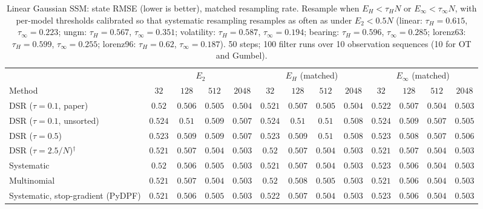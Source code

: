 \begin{table}[ht]
\centering
\small
\caption{Linear Gaussian SSM: state RMSE (lower is better), matched resampling rate. Resample when $E_H<\tau_HN$ or $E_\infty<\tau_\infty N$, with per-model thresholds calibrated so that systematic resampling resamples as often as under $E_2<0.5N$ (linear: $\tau_H{=}0.615$, $\tau_\infty{=}0.223$; ungm: $\tau_H{=}0.567$, $\tau_\infty{=}0.351$; volatility: $\tau_H{=}0.587$, $\tau_\infty{=}0.194$; bearing: $\tau_H{=}0.596$, $\tau_\infty{=}0.285$; lorenz63: $\tau_H{=}0.599$, $\tau_\infty{=}0.255$; lorenz96: $\tau_H{=}0.62$, $\tau_\infty{=}0.187$). 50 steps; 100 filter runs over 10 observation sequences (10 for OT and Gumbel).}
\label{tab:trigger-matched-linear-rmse}
\begin{adjustbox}{max width=\linewidth}
\begin{tabular}{lcccc|cccc|cccc}
\toprule
 & \multicolumn{4}{c}{$E_2$} & \multicolumn{4}{c}{$E_H$ (matched)} & \multicolumn{4}{c}{$E_\infty$ (matched)} \\
\cmidrule(lr){2-5} \cmidrule(lr){6-9} \cmidrule(lr){10-13}
Method & $32$ & $128$ & $512$ & $2048$ & $32$ & $128$ & $512$ & $2048$ & $32$ & $128$ & $512$ & $2048$ \\
\midrule
DSR ($\tau{=}0.1$, paper) & $\mathbf{0.52}$ & $\mathbf{0.506}$ & $0.505$ & $0.504$ & $0.521$ & $0.507$ & $0.505$ & $0.504$ & $0.522$ & $0.507$ & $\mathbf{0.504}$ & $\mathbf{0.503}$ \\
DSR ($\tau{=}0.1$, unsorted) & $0.524$ & $0.51$ & $0.509$ & $0.507$ & $0.524$ & $0.51$ & $0.51$ & $0.508$ & $\mathbf{0.524}$ & $\mathbf{0.509}$ & $\mathbf{0.507}$ & $\mathbf{0.505}$ \\
DSR ($\tau{=}0.5$) & $\mathbf{0.523}$ & $0.509$ & $0.509$ & $0.507$ & $0.523$ & $0.509$ & $0.51$ & $0.508$ & $0.523$ & $\mathbf{0.508}$ & $\mathbf{0.507}$ & $\mathbf{0.506}$ \\
DSR ($\tau{=}2.5/N$)$^\dagger$ & $0.521$ & $\mathbf{0.507}$ & $0.504$ & $0.503$ & $\mathbf{0.52}$ & $0.507$ & $0.504$ & $\mathbf{0.503}$ & $0.521$ & $0.507$ & $\mathbf{0.504}$ & $0.503$ \\
\midrule
Systematic & $\mathbf{0.52}$ & $0.506$ & $0.505$ & $\mathbf{0.503}$ & $0.521$ & $0.507$ & $\mathbf{0.504}$ & $0.503$ & $0.523$ & $\mathbf{0.506}$ & $0.504$ & $0.503$ \\
Multinomial & $0.521$ & $0.507$ & $0.504$ & $\mathbf{0.503}$ & $\mathbf{0.52}$ & $0.508$ & $0.505$ & $0.503$ & $0.521$ & $\mathbf{0.506}$ & $\mathbf{0.504}$ & $0.503$ \\
Systematic, stop-gradient (PyDPF) & $\mathbf{0.521}$ & $0.506$ & $0.505$ & $\mathbf{0.503}$ & $0.522$ & $0.507$ & $\mathbf{0.504}$ & $0.503$ & $0.523$ & $\mathbf{0.506}$ & $0.504$ & $0.503$ \\

\end{tabular}
\end{adjustbox}
\end{table}
